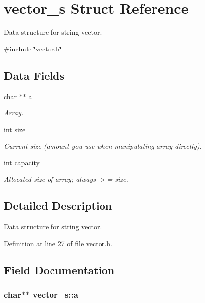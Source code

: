 \hypertarget{structvector__s}{
\section{vector\_\-s Struct Reference}
\label{structvector__s}
}


Data structure for string vector.  




{\ttfamily \#include \char`\"{}vector.h\char`\"{}}

\subsection*{Data Fields}
\begin{DoxyCompactItemize}
\item 
char $\ast$$\ast$ \hyperlink{structvector__s_a106b319236f6163ae3ae4ae132221607}{a}
\begin{DoxyCompactList}\small\item\em Array. \item\end{DoxyCompactList}\item 
int \hyperlink{structvector__s_a817205845ca0191af990f05b62e587b9}{size}
\begin{DoxyCompactList}\small\item\em Current size (amount you use when manipulating array directly). \item\end{DoxyCompactList}\item 
int \hyperlink{structvector__s_a8db5892656cbc148d5bf3b8fcb144df9}{capacity}
\begin{DoxyCompactList}\small\item\em Allocated size of array; always $>$= size. \item\end{DoxyCompactList}\end{DoxyCompactItemize}


\subsection{Detailed Description}
Data structure for string vector. 

Definition at line 27 of file vector.h.



\subsection{Field Documentation}
\hypertarget{structvector__s_a106b319236f6163ae3ae4ae132221607}{
\subsubsection[{a}]{\setlength{\rightskip}{0pt plus 5cm}char$\ast$$\ast$ {\bf vector\_\-s::a}}}
\label{structvector__s_a106b319236f6163ae3ae4ae132221607}


